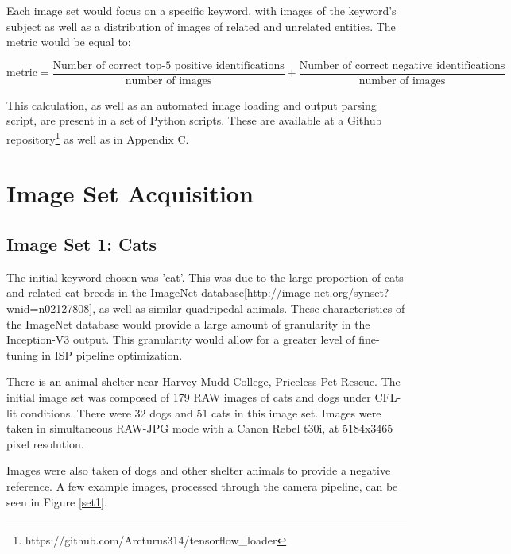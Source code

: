\documentclass{report}
\begin{document}
		Each image set would focus on a specific keyword, with images of the keyword's subject as well as a distribution of images of related and unrelated entities. The metric would be equal to:
		
		\footnotesize
		\begin{equation*}
			\text{metric}=\frac{\text{Number of correct top-5 positive identifications}}{\text{number of images}} + \frac{\text{Number of correct negative identifications}}{\text{number of images}}
		\end{equation*}
		\normalsize
		
		This calculation, as well as an automated image loading and output parsing script, are present in a set of Python scripts. These are available at a Github repository\footnote{https://github.com/Arcturus314/tensorflow\_loader} as well as in Appendix C.
	\section{Image Set Acquisition}
		\subsection{Image Set 1: Cats}
		The initial keyword chosen was 'cat'. This was due to the large proportion of cats and related cat breeds in the ImageNet database\ref{http://image-net.org/synset?wnid=n02127808}, as well as similar quadripedal animals. These characteristics of the ImageNet database would provide a large amount of granularity in the Inception-V3 output. This granularity would allow for a greater level of fine-tuning in ISP pipeline optimization.
		
		There is an animal shelter near Harvey Mudd College, Priceless Pet Rescue\cite{http://pricelesspetrescue.org/}. The initial image set was composed of 179 RAW images of cats and dogs under CFL-lit conditions. There were 32 dogs and 51 cats in this image set. Images were taken in simultaneous RAW-JPG mode with a Canon Rebel t30i, at 5184x3465 pixel resolution.
		
		Images were also taken of dogs and other shelter animals to provide a negative reference. A few example images, processed through the camera pipeline, can be seen in Figure \ref{set1}.
		
\end{document}

